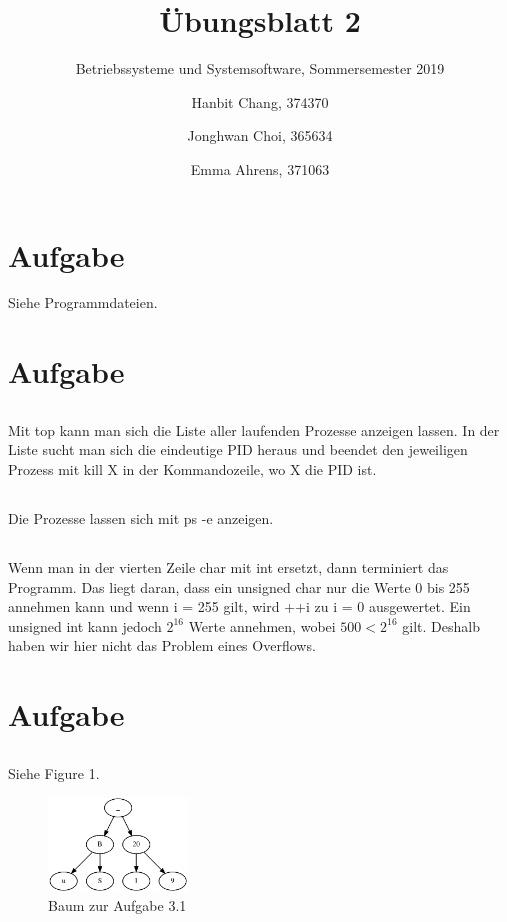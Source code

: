 \documentclass{scrartcl}
\title{Übungsblatt 2}
\subtitle{Betriebssysteme und Systemsoftware, Sommersemester 2019}
\author{ Hanbit Chang, 374370 \and Jonghwan Choi, 365634 \and Emma Ahrens, 371063}
\begin{document}
\maketitle

\section{Aufgabe}

Siehe Programmdateien.

\section{Aufgabe}

\subsection{}
Mit top kann man sich die Liste aller laufenden Prozesse anzeigen lassen. In der Liste sucht man sich die eindeutige PID heraus und beendet den jeweiligen Prozess mit kill X in der Kommandozeile, wo X die PID ist.

\subsection{}
Die Prozesse lassen sich mit ps -e anzeigen.

\subsection{}
Wenn man in der vierten Zeile char mit int ersetzt, dann terminiert das Programm.
Das liegt daran, dass ein unsigned char nur die Werte 0 bis 255 annehmen kann und wenn i = 255 gilt, wird ++i zu i = 0 ausgewertet. Ein unsigned int kann jedoch $2^{16}$ Werte annehmen, wobei $500 < 2^{16}$ gilt. Deshalb haben wir hier nicht das Problem eines Overflows. 

\section{Aufgabe}

\subsection{}
Siehe Figure 1.

\begin{figure}[ht]
	\centering
	\includegraphics[width=0.33\textwidth]{Prozessbaum.png}
	\caption{Baum zur Aufgabe 3.1}
\end{figure}
\end{document}

